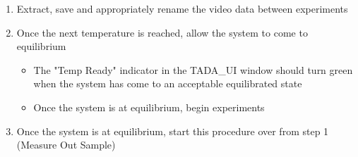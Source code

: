 \documentclass[letterpaper,11pt]{article}
\begin{document}
\begin{enumerate}
    \item Extract, save and appropriately rename the video data between experiments    
    \item Once the next temperature is reached, allow the system to come to 
        equilibrium
        \begin{itemize}
        \item The "Temp Ready" indicator in the TADA\_UI window should turn 
            green when the system has come to an acceptable equilibrated state
        \item Once the system is at equilibrium, begin experiments
        \end{itemize}
    \item Once the system is at equilibrium, start this procedure over from 
        step 1 (Measure Out Sample)
    \end{enumerate}

    
\end{document}
